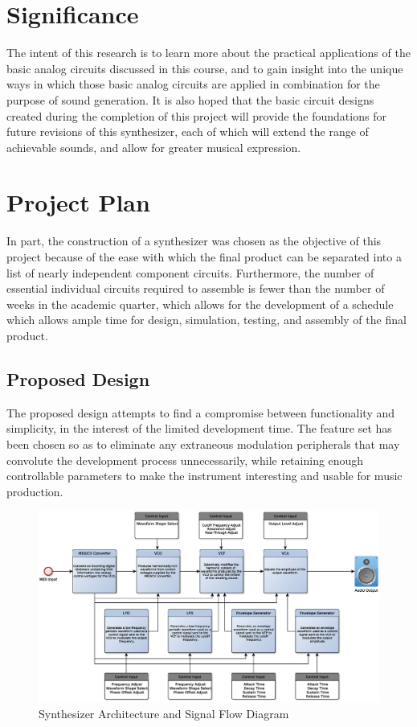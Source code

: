 \documentclass[10pt,a4paper]{article}
\begin{document}
	\section{Significance}
		The intent of this research is to learn more about the practical applications of the basic analog circuits discussed in this course, and to gain insight into the unique ways in which those basic analog circuits are applied in combination for the purpose of sound generation. It is also hoped that the basic circuit designs created during the completion of this project will provide the foundations for future revisions of this synthesizer, each of which will extend the range of achievable sounds, and allow for greater musical expression. 

	\section{Project Plan}
		In part, the construction of a synthesizer was chosen as the objective of this project because of the ease with which the final product can be separated into a list of nearly independent component circuits. Furthermore, the number of essential individual circuits required to assemble is fewer than the number of weeks in the academic quarter, which allows for the development of a schedule which allows ample time for design, simulation, testing, and assembly of the final product. 
		\newpage
		\subsection{Proposed Design}
		The proposed design attempts to find a compromise between functionality and simplicity, in the interest of the limited development time. The feature set has been chosen so as to eliminate any extraneous modulation peripherals that may convolute the development process unnecessarily, while retaining enough controllable parameters to make the instrument interesting and usable for music production.
		
		\begin{figure}[H]
			\includegraphics[width=\textwidth]{./figures/synthesizer.eps}
			\caption{Synthesizer Architecture and Signal Flow Diagram}
			\label{fig:1}
		\end{figure}
\end{document}
